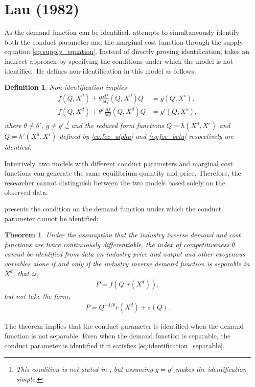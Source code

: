 \documentclass[11pt, a4paper]{article}
\newtheorem{theorem}{Theorem}
\newtheorem{definition}{Definition}
\theoremstyle{remark}
\begin{document}
\section{Lau (1982)}
As the demand function can be identified, \citet{lau1982identifying} attempts to simultaneously identify both the conduct parameter and the marginal cost function through the supply equation \eqref{eq:supply_equation}. 
Instead of directly proving identification, \citet{lau1982identifying} takes an indirect approach by specifying the conditions under which the model is not identified. 
He defines non-identification in this model as follows:
\begin{definition}\label{def:non_identification}
    Non-identification implies
    \begin{align}
    f(Q, X^{d}) + \theta \frac{\partial f}{\partial Q}(Q, X^{d})Q &= g(Q, X^{s}),\label{eq:foc_alpha}\\
    f(Q, X^{d}) + \theta' \frac{\partial f}{\partial Q}(Q, X^{d})Q &= g'(Q, X^{s}), \label{eq:foc_beta}
    \end{align}
    where $\theta \neq \theta'$, $g \ne g'$,\footnote{This condition is not stated in \citet{lau1982identifying}, but assuming $g = g'$ makes the identification simple.} and the reduced form functions $Q = h(X^{d}, X^{s})$ and $Q = h'(X^{d}, X^{s})$ defined by \eqref{eq:foc_alpha} and \eqref{eq:foc_beta} respectively are identical.
\end{definition}
Intuitively, two models with different conduct parameters and marginal cost functions can generate the same equilibrium quantity and price. 
Therefore, the researcher cannot distinguish between the two models based solely on the observed data.

\citet{lau1982identifying} presents the condition on the demand function under which the conduct parameter cannot be identified:
\begin{theorem}\label{theorem_lau}
    Under the assumption that the industry inverse demand and cost functions are twice continuously differentiable, the index of competitiveness $\theta$ cannot be identified from data on industry price and output and other exogenous variables alone if and only if the industry inverse demand function is separable in $X^{d}$, that is,
    \begin{align}
        P = f(Q, r(X^{d})), \label{eq:demand_separable}
    \end{align}
    but not take the form, 
    \begin{align}
        P = Q^{-1/\theta}r(X^{d}) + s(Q). \label{eq:identification_separable}
    \end{align}
\end{theorem}
The theorem implies that the conduct parameter is identified when the demand function is not separable.
Even when the demand function is separable, the conduct parameter is identified if it satisfies \eqref{eq:identification_separable}.
\end{document}

